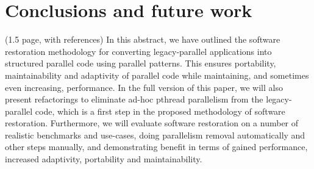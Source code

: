 \documentclass{llncs}
\begin{document}
\section{Conclusions and future work} \label{sec:Conclusions} (1.5 page, with references)
In this abstract, we have outlined the software restoration methodology for converting legacy-parallel applications into structured parallel code using parallel patterns. This ensures portability, maintainability and adaptivity of parallel code while maintaining, and sometimes even increasing, performance. In the full version of this paper, we will also present refactorings to eliminate ad-hoc pthread parallelism from the legacy-parallel code, which is a first step in the proposed methodology of software restoration. Furthermore, we will evaluate software restoration on a number of realistic benchmarks and use-cases, doing parallelism removal automatically and other steps manually, and demonstrating benefit in terms of gained performance, increased adaptivity, portability and maintainability.








\end{document}
